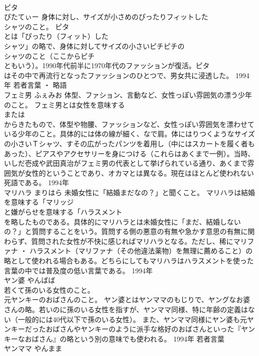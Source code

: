 \documentclass[8pt]{extreport}
\begin{document}
\begin{CJK}{UTF8}{min}
\\	ピタ
\\	ぴたてぃー	身体に対し、サイズが小さめのぴったりフィットした
\\	シャツのこと。	ピタ
\\	とは「ぴったり（フィット）した
\\	シャツ」の略で、身体に対してサイズの小さいピチピチの
\\	シャツのこと（ここからピチ
\\	ともいう）。1990年代前半に1970年代のファッションが復活。ピタ
\\	はその中で再流行となったファッションのひとつで、男女共に浸透した。	1994年	若者言葉 ・ 略語	
\\	フェミ男	ふぇみお	体型、ファション、言動など、女性っぽい雰囲気の漂う少年のこと。	フェミ男とは女性を意味する
\\	または
\\	からきたもので、体型や物腰、ファッションなど、女性っぽい雰囲気を漂わせている少年のこと。具体的には体の線が細く、なで肩。体にはりつくようなサイズの小さいＴシャツ、すその広がったパンツを着用し（中にはスカートを履く者もあった）、ピアスやアクセサリーを身につける（これらはあくまで一例）。当時、いしだ壱成や武田真治がフェミ男の代表として挙げられている通り、あくまで雰囲気が女性的ということであり、オカマとは異なる。現在はほとんど使われない死語である。	1994年	
\\	マリハラ	まりはら	未婚女性に「結婚まだなの？」と聞くこと。	マリハラは結婚を意味する「マリッジ
\\	と嫌がらせを意味する「ハラスメント
\\	を略したものである。具体的にマリハラとは未婚女性に「まだ、結婚しないの？」と質問することをいう。質問する側の悪意の有無や急かす意思の有無に関わらず、質問された女性が不快に感じればマリハラとなる。ただし、稀にマリファナ ・ ハラスメント（マリファナ（その他違法薬物）を無理に薦めること）の略として使われる場合もある。どちらにしてもマリハラはハラスメントを使った言葉の中では普及度の低い言葉である。	1994年	
\\	ヤン婆	やんばば	
\\	若くて孫のいる女性のこと。 
\\	元ヤンキーのおばさんのこと。	ヤン婆とはヤンママのもじりで、ヤングなお婆さんの略。若いのに孫のいる女性を指すが、ヤンママ同様、特に年齢の定義はない（一般的には40代以下で孫のいる女性）。 また、ヤンママ同様にヤン婆も元ヤンキーだったおばさんやヤンキーのように派手な格好のおばさんといった『ヤンキーなおばさん』の略という別の意味でも使われる。	1994年	若者言葉	
\\	ヤンママ	やんまま	

\end{CJK}
\end{document}
